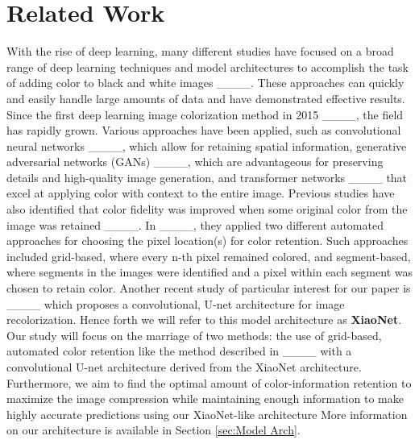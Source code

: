\section{Related Work}
With the rise of deep learning, many different studies have focused on a broad range of deep learning techniques and model architectures to accomplish the task of adding color to black and white images ____. These approaches can quickly and easily handle large amounts of data and have demonstrated effective results. Since the first deep learning image colorization method in 2015 ____, the field has rapidly grown. Various approaches have been applied, such as convolutional neural networks ____, which allow for retaining spatial information, generative adversarial networks (GANs) ____, which are advantageous for preserving details and high-quality image generation, and transformer networks ____ that excel at applying color with context to the entire image. Previous studies have also identified that color fidelity was improved when some original color from the image was retained ____. In ____, they applied two different automated approaches for choosing the pixel location(s) for color retention. Such approaches included grid-based, where every n-th pixel remained colored, and segment-based, where segments in the images were identified and a pixel within each segment was chosen to retain color. Another recent study of particular interest for our paper is ____ which proposes a convolutional, U-net architecture for image recolorization. Hence forth we will refer to this model architecture as \textbf{XiaoNet}. Our study will focus on the marriage of two methods: the use of grid-based, automated color retention like the method described in ____ with a convolutional U-net architecture derived from the XiaoNet architecture. Furthermore, we aim to find the optimal amount of color-information retention to maximize the image compression while maintaining enough information to make highly accurate predictions using our XiaoNet-like architecture More information on our architecture is available in Section \ref{sec:Model Arch}.